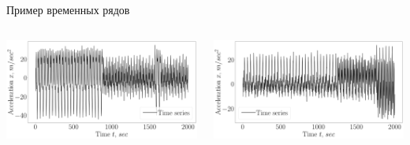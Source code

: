 \documentclass[10pt,pdf,hyperref={unicode}]{beamer}
\begin{document}
\begin{frame}[shrink=5]{Пример временных рядов}
\justifying

\begin{columns}
    \begin{column}{0.5\textwidth}
        \includegraphics[width=1\textwidth]{results/2_patern_2_series}
    \end{column}
    \begin{column}{0.5\textwidth}
        \includegraphics[width=1\textwidth]{results/3_patern_2_series}
    \end{column}
\end{columns}


\end{frame}
\end{document}
